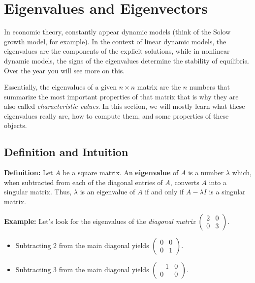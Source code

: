 \documentclass[11pt]{article}
\providecommand{\tightlist}{%
      \setlength{\itemsep}{0pt}\setlength{\parskip}{0pt}}
\begin{document}
    \hypertarget{eigenvalues-and-eigenvectors}{%
\section{Eigenvalues and
Eigenvectors}\label{eigenvalues-and-eigenvectors}}

In economic theory, constantly appear dynamic models (think of the Solow
growth model, for example). In the context of linear dynamic models, the
eigenvalues are the components of the explicit solutions, while in
nonlinear dynamic models, the signs of the eigenvalues determine the
stability of equilibria. Over the year you will see more on this.

Essentially, the eigenvalues of a given \(n\times n\) matrix are the
\(n\) numbers that summarize the most important properties of that
matrix that is why they are also called \emph{characteristic values}. In
this section, we will mostly learn what these eigenvalues really are,
how to compute them, and some properties of these objects.

\hypertarget{definition-and-intuition}{%
\subsection{Definition and Intuition}\label{definition-and-intuition}}

\textbf{Definition:} Let \(A\) be a square matrix. An
\textbf{eigenvalue} of \(A\) is a number \(\lambda\) which, when
subtracted from each of the diagonal entries of \(A\), converts \(A\)
into a singular matrix. Thus, \(\lambda\) is an eigenvalue of \(A\) if
and only if \(A-\lambda I\) is a singular matrix.

\textbf{Example:} Let's look for the eigenvalues of the \emph{diagonal
matrix} \(\begin{pmatrix} 2 & 0 \\ 0 & 3 \end{pmatrix}\).

\begin{itemize}
\tightlist
\item
  Subtracting \(2\) from the main diagonal yields
  \(\begin{pmatrix} 0 & 0 \\ 0 & 1 \end{pmatrix}\).
\item
  Subtracting \(3\) from the main diagonal yields
  \(\begin{pmatrix} -1 & 0 \\ 0 & 0 \end{pmatrix}\).
\end{itemize}
\end{document}
